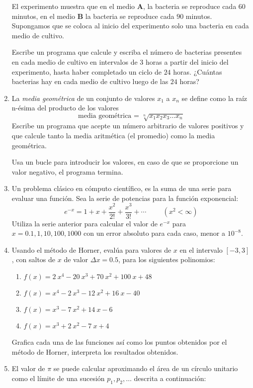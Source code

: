 \begin{enumerate}
El experimento muestra que en el medio \textbf{A}, la bacteria se reproduce cada $60$ minutos, en el medio \textbf{B} la bacteria se reproduce cada $90$ minutos. Supongamos que se coloca al inicio del experimento solo una bacteria en cada medio de cultivo.
\par
Escribe un programa que calcule y escriba el número de bacterias presentes en cada medio de cultivo en intervalos de $3$ horas a partir del inicio del experimento, hasta haber completado un ciclo de $24$ horas. ¿Cuántas bacterias hay en cada medio de cultivo luego de las $24$ horas?
\item La \textit{media geométrica} de un conjunto de valores $x_{1}$ a $x_{n}$ se define como la raíz n-ésima del producto de los valores
\[ \text{media geométrica = } \sqrt[n]{x_{1}x_{2}x_{3} \ldots x_{n}}\]
Escribe un programa que acepte un número arbitrario de valores positivos y que calcule tanto la media aritmética (el promedio) como la media geométrica.
\par
Usa un bucle para introducir los valores, en caso de que se proporcione un valor negativo, el programa termina.
\item Un problema clásico en cómputo científico, es la suma de una serie para evaluar una función. Sea la serie de potencias para la función exponencial:
\[e^{-x} = 1 + x + \dfrac{x^{2}}{2!} + \dfrac{x^{3}}{3!} +\cdots \hspace{1cm} (x^{2} < \infty)  \]
Utiliza la serie anterior para calcular el valor de $e^{-x}$ para $x=0.1, 1, 10, 100, 1000$ con un error absoluto para cada caso, menor a $10^{-8}$.
\item Usando el método de Horner, evalúa para valores de $x$ en el intervalo $[-3,3]$, con saltos de $x$ de valor $\Delta x = 0.5$, para los siguientes polinomios:
\begin{enumerate}
\item $f(x) = 2 \: x^{4} - 20\: x^{3} + 70 \: x^{2} + 100 \: x + 48$
\item $f(x) = x^{4} - 2 \: x^{3} - 12 \: x^{2} + 16 \: x - 40$
\item $f(x) = x^{3} - 7 \: x^{2} + 14 \: x - 6$
\item $f(x) = x^{3} + 2 \: x^{2} -  7 \: x + 4$
\end{enumerate}
Grafica cada una de las funciones así como los puntos obtenidos por el método de Horner, interpreta los resultados obtenidos.
\item El valor de $\pi$ se puede calcular aproximando el área de un círculo unitario como el límite de una sucesión $p_{1}, p_{2}, \ldots$ descrita a continuación:

\end{enumerate}
